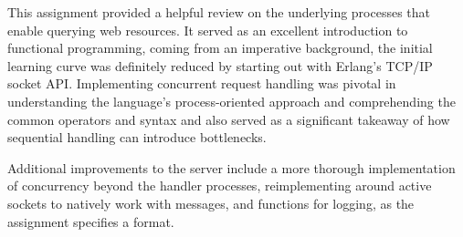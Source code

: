 \documentclass[a4paper, 11pt]{article}
\begin{document}
This assignment provided a helpful review on the underlying processes that enable querying web resources.
It served as an excellent introduction to functional programming, coming from an imperative background, the initial learning curve was definitely reduced by starting out with Erlang's TCP/IP socket API.
Implementing concurrent request handling was pivotal in understanding the language's process-oriented approach and comprehending the common operators and syntax and also served as a significant takeaway of how sequential handling can introduce bottlenecks.

Additional improvements to the server include a more thorough implementation of concurrency beyond the handler processes, reimplementing around active sockets to natively work with messages, and functions for logging, as the assignment specifies a format.
\end{document}
